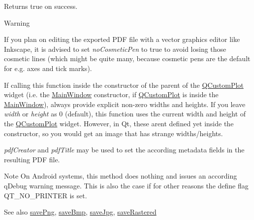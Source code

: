Returns true on success.

\begin{DoxyWarning}{Warning}
\begin{DoxyItemize}
\item If you plan on editing the exported P\+DF file with a vector graphics editor like Inkscape, it is advised to set {\itshape no\+Cosmetic\+Pen} to true to avoid losing those cosmetic lines (which might be quite many, because cosmetic pens are the default for e.\+g. axes and tick marks). \item If calling this function inside the constructor of the parent of the \hyperlink{class_q_custom_plot}{Q\+Custom\+Plot} widget (i.\+e. the \hyperlink{class_main_window}{Main\+Window} constructor, if \hyperlink{class_q_custom_plot}{Q\+Custom\+Plot} is inside the \hyperlink{class_main_window}{Main\+Window}), always provide explicit non-\/zero widths and heights. If you leave {\itshape width} or {\itshape height} as 0 (default), this function uses the current width and height of the \hyperlink{class_q_custom_plot}{Q\+Custom\+Plot} widget. However, in Qt, these aren\textquotesingle{}t defined yet inside the constructor, so you would get an image that has strange widths/heights.\end{DoxyItemize}
{\itshape pdf\+Creator} and {\itshape pdf\+Title} may be used to set the according metadata fields in the resulting P\+DF file.
\end{DoxyWarning}
\begin{DoxyNote}{Note}
On Android systems, this method does nothing and issues an according q\+Debug warning message. This is also the case if for other reasons the define flag Q\+T\+\_\+\+N\+O\+\_\+\+P\+R\+I\+N\+T\+ER is set.
\end{DoxyNote}
\begin{DoxySeeAlso}{See also}
\hyperlink{class_q_custom_plot_a7636261aff1f6d25c9da749ece3fc8b8}{save\+Png}, \hyperlink{class_q_custom_plot_a6629d9e8e6da4bf18055ee0257fdce9a}{save\+Bmp}, \hyperlink{class_q_custom_plot_a490c722092d1771e8ce4a7a73dfd84ab}{save\+Jpg}, \hyperlink{class_q_custom_plot_ab528b84cf92baabe29b1d0ef2f77c93e}{save\+Rastered} 
\end{DoxySeeAlso}
